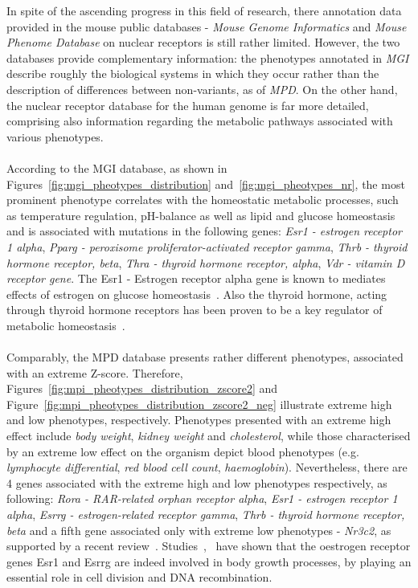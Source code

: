 \documentclass[fleqn,11pt]{SelfArx}
\begin{document}
In spite of the ascending progress in this field of research, there annotation data provided in the mouse public databases - \textit{Mouse Genome Informatics} and \textit{Mouse Phenome Database} on nuclear receptors is still rather limited. However, the two databases provide complementary information: the phenotypes annotated in \textit{MGI} describe roughly the biological systems in which they occur rather than the description of differences between non-variants, as of \textit{MPD}. On the other hand, the nuclear receptor database for the human genome is far more detailed, comprising also information regarding the metabolic pathways associated with various phenotypes. 
~~~~~~~\\
~~~~~~~\\
According to the MGI database, as shown in Figures~\ref{fig:mgi_pheotypes_distribution} and~\ref{fig:mgi_pheotypes_nr}, the most prominent phenotype correlates with the homeostatic metabolic processes, such as temperature regulation, pH-balance as well as lipid and glucose homeostasis and is associated with mutations in the following genes: \textit{Esr1 - estrogen receptor 1 alpha}, \textit{Pparg - peroxisome proliferator-activated receptor gamma}, \textit{Thrb - thyroid hormone receptor, beta}, \textit{Thra - thyroid hormone receptor, alpha}, \textit{Vdr - vitamin D receptor gene}. The Esr1 - Estrogen receptor alpha gene is known to mediates effects of estrogen on glucose homeostasis~\cite{esr1_discussion}. Also the thyroid hormone, acting through thyroid hormone receptors has been proven to be a key regulator of metabolic homeostasis~\cite{thra_discussion}. 
~~~~~~~\\
~~~~~~~\\
Comparably, the MPD database presents rather different phenotypes, associated with an extreme Z-score. Therefore, Figures~\ref{fig:mpi_pheotypes_distribution_zscore2} and Figure~\ref{fig:mpi_pheotypes_distribution_zscore2_neg} illustrate extreme high and low phenotypes, respectively. Phenotypes presented with an extreme high effect include  \textit{body weight}, \textit{kidney weight} and \textit{cholesterol}, while those characterised by an extreme low effect on the organism depict blood phenotypes (e.g. \textit{lymphocyte differential}, \textit{red blood cell count}, \textit{haemoglobin}). Nevertheless, there are 4 genes associated with the extreme high and low phenotypes respectively, as following: \textit{Rora - RAR-related orphan receptor alpha}, \textit{Esr1 - estrogen receptor 1 alpha}, \textit{Esrrg - estrogen-related receptor gamma}, \textit{Thrb - thyroid hormone receptor, beta} and a fifth gene associated only with extreme low phenotypes - \textit{Nr3c2}, as supported by a recent review~\cite{blood_discussion}. Studies~\cite{esr12_discussion},~\cite{esrrg_discussion} have shown that the oestrogen receptor genes Esr1 and Esrrg are indeed involved in body growth processes, by playing an essential role in cell division and DNA recombination.  
\end{document}
